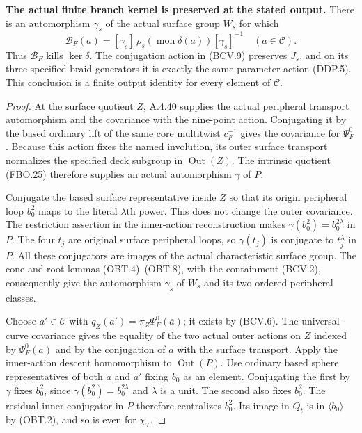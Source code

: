 \par\medskip\noindent\textbf{The actual finite branch kernel is preserved at the stated output.}\quad
There is an automorphism $\gamma_s$ of the actual surface
group $W_s$ for which
\[
 \mathcal B_F(a)=
      [\gamma_s]\,\rho_s(\operatorname{mon}\delta(a))
                       [\gamma_s]^{-1}\quad(a\in\mathcal C).
                                                               \tag{BCV.9}
\]
Thus $\mathcal B_F$ kills $\ker\delta$.
The conjugation action in (BCV.9) preserves $J_s$, and on
its three specified braid generators it is exactly the
same-parameter action (DDP.5).  This conclusion is a
finite output identity for every element of $\mathcal C$.


\begin{proof}
At the surface quotient $Z$, A.4.40 supplies the actual
peripheral transport automorphism and the covariance
with the nine-point action.  Conjugating it by the based
ordinary lift of the same core multitwist $c_F^{-1}$ gives
the covariance for $\Psi_F^0$.
Because this action fixes the named involution, its outer
surface transport normalizes the specified deck subgroup
in $\operatorname{Out}(Z)$.
The intrinsic quotient (FBO.25) therefore supplies an
actual automorphism $\gamma$ of $P$.

Conjugate the based surface representative inside $Z$ so
that its origin peripheral loop $b_0^2$ maps to the literal
$\lambda$th power.  This does not change the outer
covariance.  The restriction assertion in the inner-action
reconstruction makes
$\gamma(b_0^2)=b_0^{2\lambda}$ in $P$.
The four $t_j$ are original surface peripheral loops, so
$\gamma(t_j)$ is conjugate to $t_j^\lambda$ in $P$.
All these conjugators are images of the actual characteristic
surface group.  The cone and root lemmas (OBT.4)--(OBT.8),
with the containment (BCV.2), consequently give the
automorphism $\gamma_s$ of $W_s$ and its two ordered
peripheral classes.

Choose $a'\in\mathcal C$ with
$q_Z(a')=\pi_Z\Psi_F^0(\bar a)$; it exists by (BCV.6).
The universal-curve covariance gives the equality of the
two actual outer actions on $Z$ indexed by
$\Psi_F^0(a)$ and by the conjugation of $a$ with the
surface transport.  Apply the inner-action descent
homomorphism to $\operatorname{Out}(P)$.
Use ordinary based sphere representatives of both $a$ and
$a'$ fixing $b_0$ as an element.
Conjugating the first by $\gamma$ fixes $b_0^2$, since
$\gamma(b_0^2)=b_0^{2\lambda}$ and $\lambda$ is a unit.
The second also fixes $b_0^2$.
The residual inner conjugator in $P$ therefore centralizes
$b_0^2$.  Its image in $Q_t$ is in $\langle b_0\rangle$
by (OBT.2), and so is even for $\chi_T$.


\end{proof}
